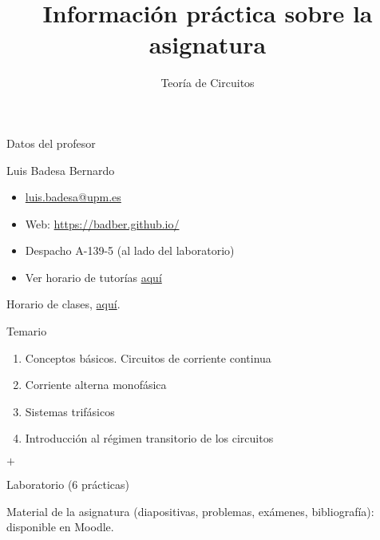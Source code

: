 \documentclass[aspectratio=169, usenames,svgnames,dvipsnames]{beamer}
\date{}
\title{\LARGE Información práctica sobre la asignatura \vspace{5mm}}
\subtitle{Teoría de Circuitos}
\begin{document}
\maketitle


\begin{frame}{Datos del profesor}
    
    Luis Badesa Bernardo
        \begin{itemize}
        \item \href{mailto:luis.badesa@upm.es}{luis.badesa@upm.es}
        \item Web: \url{https://badber.github.io/}
        \item Despacho A-139-5 (al lado del laboratorio)
        \item Ver horario de tutorías 
        \href{http://programas.etsidi.upm.es/SOA/tutorias/}{aquí}            
    \end{itemize}
    \vspace{6mm}
    Horario de clases, \href{https://www.etsidi.upm.es/Estudiantes/AgendaAcademica/AAHorarioClases}{aquí}.
    

\end{frame}


\begin{frame}{Temario}
    \begin{enumerate}
        \item Conceptos básicos. Circuitos de corriente continua
        \item Corriente alterna monofásica
        \item Sistemas trifásicos
        \item Introducción al régimen transitorio de los circuitos
    \end{enumerate}
    \hspace{7mm} $+$
    
    \hspace{7mm} Laboratorio (6 prácticas)

    \vspace{7mm}

    \hspace{7mm} \alert{Material de la asignatura} (diapositivas, problemas, exámenes, bibliografía): 
    \vspace{1mm}
    \hspace{7mm} disponible en Moodle.

\end{frame}
\end{document}
